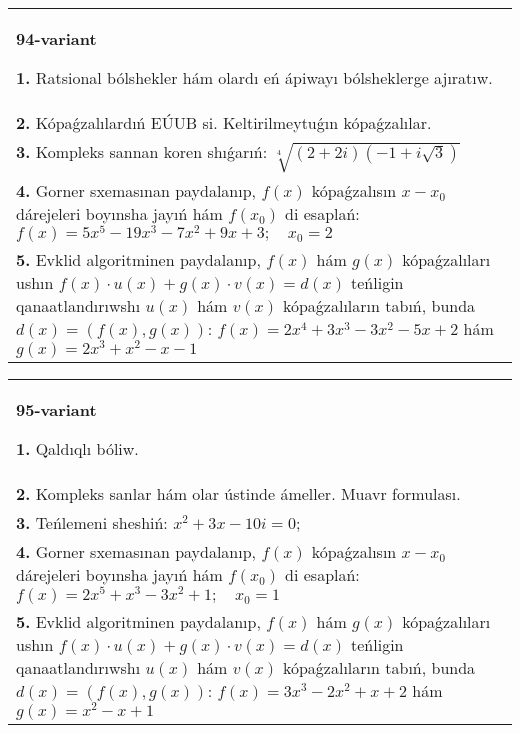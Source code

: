 \documentclass{article}
\begin{document}
\begin{tabular}{m{17cm}}
\textbf{94-variant}
\newline

\textbf{1.} Ratsional bólshekler hám olardı eń ápiwayı bólsheklerge ajıratıw. \\
\textbf{2.} Kópaǵzalılardıń EÚUB si. Keltirilmeytuǵın   kópaǵzalılar. \\
\textbf{3.} Kompleks sannan koren shıǵarıń: $\sqrt[4]{(2+2 i)(-1+i \sqrt{3})}$ \\
\textbf{4.} Gorner sxemasınan paydalanıp, $f(x)$ kópaǵzalısın $x-x_0$ dárejeleri boyınsha jayıń hám $f\left(x_0\right)$ di esaplań: $f(x)=5 x^5-19 x^3-7 x^2+9 x+3 ; \quad x_0=2$ \\
\textbf{5.} Evklid algoritminen paydalanıp, $f(x)$ hám $g(x)$ kópaǵzalıları ushın $f(x) \cdot u(x)+g(x) \cdot v(x)=d(x)$ teńligin qanaatlandırıwshı $u(x)$ hám $v(x)$ kópaǵzalıların tabıń, bunda $d(x)=(f(x), g(x))$:  $f(x)=2 x^4+3 x^3-3 x^2-5 x+2$ hám $g(x)=2 x^3+x^2-x-1$ \\

\end{tabular}
\vspace{1cm}


\begin{tabular}{m{17cm}}
\textbf{95-variant}
\newline

\textbf{1.} Qaldıqlı bóliw.  \\
\textbf{2.} Kompleks sanlar hám olar ústinde ámeller. Muavr formulası.  \\
\textbf{3.} Teńlemeni sheshiń:  $x^2+3 x-10 i=0$; \\
\textbf{4.} Gorner sxemasınan paydalanıp, $f(x)$ kópaǵzalısın $x-x_0$ dárejeleri boyınsha jayıń hám $f\left(x_0\right)$ di esaplań:  $f(x)=2 x^5+x^3-3 x^2+1 ; \quad x_0=1$ \\
\textbf{5.} Evklid algoritminen paydalanıp, $f(x)$ hám $g(x)$ kópaǵzalıları ushın $f(x) \cdot u(x)+g(x) \cdot v(x)=d(x)$ teńligin qanaatlandırıwshı $u(x)$ hám $v(x)$ kópaǵzalıların tabıń, bunda $d(x)=(f(x), g(x))$:  $f(x)=3 x^3-2 x^2+x+2$ hám $g(x)=x^2-x+1$ \\

\end{tabular}
\vspace{1cm}
\end{document}
